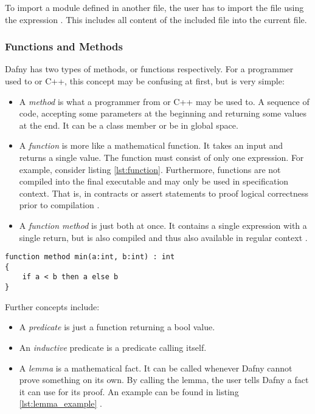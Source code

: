 To import a module defined in another file, the user has to import the file using the expression .
This includes all content of the included file into the current file.

\subsubsection{Functions and Methods}
Dafny has two types of methods, or functions respectively.
For a programmer used to \CsharpWithSpace or C++, this concept may be confusing at first, but is very simple:
\begin{itemize}
\item A \textit{method} is what a programmer from \CsharpWithSpace or C++ may be used to.
A sequence of code, accepting some parameters at the beginning and returning some values at the end.
It can be a class member or be in global space.
\item A \textit{function} is more like a mathematical function.
It takes an input and returns a single value.
The function must consist of only one expression.
For example, consider listing \ref{lst:function}.
Furthermore, functions are not compiled into the final executable and may only be used in specification context.
That is, in contracts or assert statements to proof logical correctness prior to compilation \cite{functionVSMethod}.
\item A \textit{function method} is just both at once.
It contains a single expression with a single return, but is also compiled and thus also available in regular context \cite{functionVSMethod}.
\end{itemize}

\begin{lstlisting}[language=dafny, caption={Function Method Example}, captionpos=b, label={lst:function}]
function method min(a:int, b:int) : int
{
    if a < b then a else b
}
\end{lstlisting}

Further concepts include:
\begin{itemize}
\item A \textit{predicate} is just a function returning a bool value.
\item An \textit{inductive} predicate is a predicate calling itself.
\item A \textit{lemma} is a mathematical fact.
It can be called whenever Dafny cannot prove something on its own.
By calling the lemma, the user tells Dafny a fact it can use for its proof.
An example can be found in listing \ref{lst:lemma_example} \cite{dafnyReferenceManual}.
\end{itemize}

